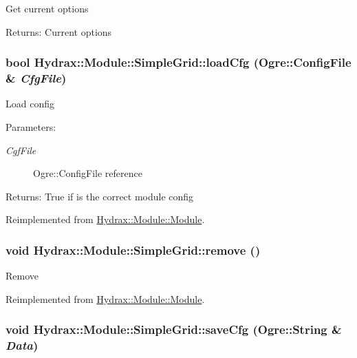 Get current options \begin{Desc}
\item[Returns:]Current options \end{Desc}
\hypertarget{class_hydrax_1_1_module_1_1_simple_grid_3741ec1a3df1863e730711fd9d3b14e1}{
\subsubsection[{loadCfg}]{\setlength{\rightskip}{0pt plus 5cm}bool Hydrax::Module::SimpleGrid::loadCfg (Ogre::ConfigFile \& {\em CfgFile})}}
\label{class_hydrax_1_1_module_1_1_simple_grid_3741ec1a3df1863e730711fd9d3b14e1}


Load config \begin{Desc}
\item[Parameters:]
\begin{description}
\item[{\em CgfFile}]Ogre::ConfigFile reference \end{description}
\end{Desc}
\begin{Desc}
\item[Returns:]True if is the correct module config \end{Desc}


Reimplemented from \hyperlink{class_hydrax_1_1_module_1_1_module_bedb96357608c0744bb7816ae1c2b0bb}{Hydrax::Module::Module}.\hypertarget{class_hydrax_1_1_module_1_1_simple_grid_ca3e257313599b797b8a65442cecd3cc}{
\subsubsection[{remove}]{\setlength{\rightskip}{0pt plus 5cm}void Hydrax::Module::SimpleGrid::remove ()}}
\label{class_hydrax_1_1_module_1_1_simple_grid_ca3e257313599b797b8a65442cecd3cc}


Remove 

Reimplemented from \hyperlink{class_hydrax_1_1_module_1_1_module_21f60a53a99d72ff00d3fe5565518165}{Hydrax::Module::Module}.\hypertarget{class_hydrax_1_1_module_1_1_simple_grid_f79cb3a457da1fe8b015d9d7b5a6a376}{
\subsubsection[{saveCfg}]{\setlength{\rightskip}{0pt plus 5cm}void Hydrax::Module::SimpleGrid::saveCfg (Ogre::String \& {\em Data})}}
\label{class_hydrax_1_1_module_1_1_simple_grid_f79cb3a457da1fe8b015d9d7b5a6a376}


